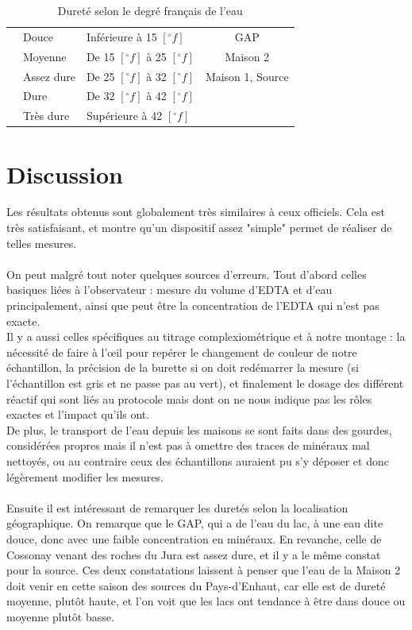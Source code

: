 \documentclass[11pt]{article}
\begin{document}
\begin{table}[H]
\centering
\begin{tabular}{p{}l|l|c|}
\cellcolor{cyan} & Douce & Inférieure à 15 $[^\circ f]$ & GAP \\ 
\cellcolor{blue} & Moyenne & De 15 $[^\circ f]$ à 25 $[^\circ f]$ & Maison 2 \\ 
\cellcolor{yellow} & Assez dure & De 25 $[^\circ f]$ à 32 $[^\circ f]$ & Maison 1, Source \\ 
\cellcolor{pink} & Dure & De 32 $[^\circ f]$ à 42 $[^\circ f]$ &  \\ 
\cellcolor{red} & Très dure & Supérieure à 42 $[^\circ f]$ &  \\ 
\end{tabular} 
\caption{Dureté selon le degré français de l'eau}
\label{tab:durete}
\end{table}

\section{Discussion}

Les résultats obtenus sont globalement très similaires à ceux officiels. Cela est très satisfaisant, et montre qu'un dispositif assez "simple" permet de réaliser de telles mesures.\\ \\
On peut malgré tout noter quelques sources d'erreurs. Tout d'abord celles basiques liées à l'observateur : mesure du volume d'EDTA et d'eau principalement, ainsi que peut être la concentration de l'EDTA qui n'est pas exacte. \\
Il y a aussi celles spécifiques au titrage complexiométrique et à notre montage : la nécessité de faire à l’œil pour repérer le changement de couleur de notre échantillon, la précision de la burette si on doit redémarrer la mesure (si l'échantillon est gris et ne passe pas au vert), et finalement le dosage des différent réactif qui sont liés au protocole mais dont on ne nous indique pas les rôles exactes et l'impact qu'ils ont.\\
De plus, le transport de l'eau depuis les maisons se sont faits dans des gourdes, considérées propres mais il n'est pas à omettre des traces de minéraux mal nettoyés, ou au contraire ceux des échantillons auraient pu s'y déposer et donc légèrement modifier les mesures. \\ \\
Ensuite il est intéressant de remarquer les duretés selon la localisation géographique. On remarque que le GAP, qui a de l'eau du lac, à une eau dite douce, donc avec une faible concentration en minéraux. En revanche, celle de Cossonay venant des roches du Jura est assez dure, et il y a le même constat pour la source. Ces deux constatations laissent à penser que l'eau de la Maison 2 doit venir en cette saison des sources du Pays-d’Enhaut, car elle est de dureté moyenne, plutôt haute, et l'on voit que les lacs ont tendance à être dans douce ou moyenne plutôt basse.
\end{document}
